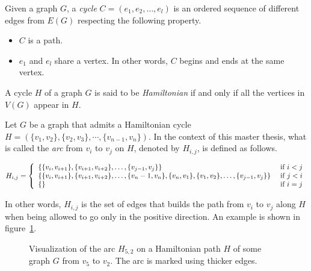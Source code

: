\begin{definition}[Cycle]
    \label{def:cycle}
    Given a graph $G$, a \textit{cycle} $C = (e_1, e_2, \dots, e_l)$ is an ordered sequence of different edges from $E(G)$ respecting the following property.
    \begin{itemize}
        \item $C$ is a path.
        \item $e_1$ and $e_l$ share a vertex.
            In other words, $C$ begins and ends at the same vertex.
    \end{itemize}
\end{definition}

\begin{definition}
    \label{def:hamiltonian_cycle}
    A cycle $H$ of a graph $G$ is said to be \textit{Hamiltonian} if and only if all the vertices in $V(G)$ appear in $H$.
\end{definition}

\begin{definition}
    \label{def:arc}
    Let $G$ be a graph that admits a Hamiltonian cycle $H = \left(\{v_1, v_2\}, \{v_2, v_3\}, \cdots, \{v_{n-1}, v_n\}\right)$.
    In the context of this master thesis, what is called the \textit{arc} from $v_i$ to $v_j$ on $H$, denoted by $H_{i, j}$, is defined as follows.
    
    \begin{center}
        $H_{i, j} = \left\{\begin{array}{l l}
            \left\{\{v_i, v_{i+1}\}, \{v_{i+1}, v_{i+2}\}, \dots, \{v_{j-1}, v_j\}\right\}                                                       & \mbox{ if } i < j \\
            \left\{\{v_i, v_{i+1}\}, \{v_{i+1}, v_{i+2}\}, \dots, \{v_n - 1, v_n\},  \{v_n, v_1\}, \{v_1, v_2\}, \dots, \{v_{j-1}, v_j\}\right\} & \mbox{ if } j < i \\
            \left\{\right\}                                                                                                                      & \mbox{ if } i = j
        \end{array}\right.$
    \end{center}
    
    In other words, $H_{i, j}$ is the set of edges that builds the path from $v_i$ to $v_j$ along $H$ when being allowed to go only in the positive direction.
    An example is shown in figure~\ref{fig:H_i_j}.

    \begin{figure}[H]
        \caption{Visualization of the arc $H_{5, 2}$ on a Hamiltonian path $H$ of some graph $G$ from $v_5$ to $v_2$. The arc is marked using thicker edges.}
        \label{fig:H_i_j}
    \end{figure}
    
\end{definition}

